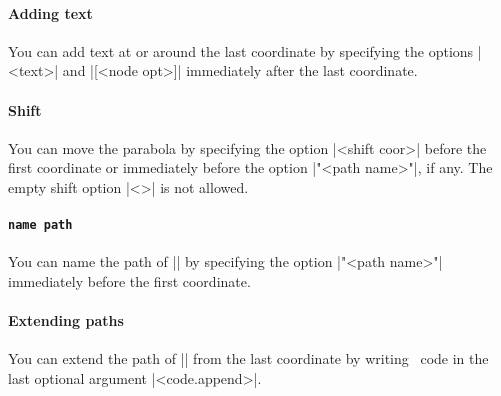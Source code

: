 \paragraph{Adding text}
You can add text at or around the last coordinate by specifying the options |{<text>}| and |[<node opt>]| immediately after the last coordinate.

\begin{tzcode}{.3}
\end{tzcode}

\paragraph{Shift}
You can move the parabola by specifying the option |<shift coor>| before the first coordinate or immediately before the option |"<path name>"|, if any.
The empty shift option |<>| is not allowed.

\begin{tzcode}{.3}
\end{tzcode}

\paragraph{\texttt{name path}}
You can name the path of |\tzparabola| by specifying the option |"<path name>"| immediately before the first coordinate.

\begin{tzcode}{.3}
\end{tzcode}

\paragraph{Extending paths}
You can extend the path of |\tzparabola| from the last coordinate by writing \Tikz\ code in the last optional argument |<code.append>|.

